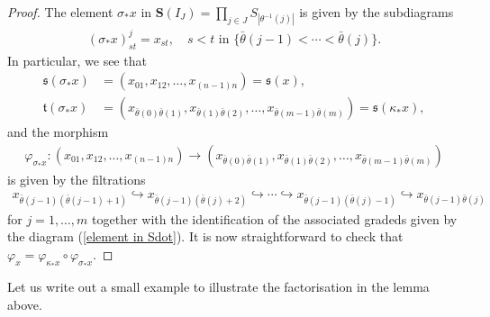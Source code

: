 \documentclass[12pt, reqno]{amsart}
\theoremstyle{plain}
\theoremstyle{definition}
\renewcommand{\phi}{\varphi}
\begin{document}
\begin{proof}
The element $\sigma_*x$ in $\mathbf{S}(I_J)=\prod_{j\in J} S_{|\theta^{-1}(j)|}$ is given by the subdiagrams 
\begin{align*}
(\sigma_*x)^j_{st}=x_{st}, \quad  s<t\text{ in } \{\bar{\theta}(j-1)<\cdots < \bar{\theta}(j)\}.
\end{align*}
In particular, we see that
\begin{align*}
\mathfrak{s}(\sigma_*x)&=(x_{01},x_{12},\ldots,x_{(n-1)n})= \mathfrak{s}(x), \\
\mathfrak{t}(\sigma_*x)&=(x_{\bar{\theta}(0)\bar{\theta}(1)},x_{\bar{\theta}(1)\bar{\theta}(2)},\ldots,x_{\bar{\theta}(m-1)\bar{\theta}(m)})=\mathfrak{s}(\kappa_*x),
\end{align*}
and the morphism
\begin{align*}
\phi_{\sigma_*x}\colon (x_{01},x_{12},\ldots,x_{(n-1)n}) \longrightarrow (x_{\bar{\theta}(0)\bar{\theta}(1)},x_{\bar{\theta}(1)\bar{\theta}(2)},\ldots,x_{\bar{\theta}(m-1)\bar{\theta}(m)})
\end{align*}
is given by the filtrations
\begin{align*}
x_{\bar{\theta}(j-1)(\bar{\theta}(j-1)+1)}\hookrightarrow x_{\bar{\theta}(j-1)(\bar{\theta}(j)+2)} \hookrightarrow \cdots \hookrightarrow x_{\bar{\theta}(j-1)(\bar{\theta}(j)-1)} \hookrightarrow x_{\bar{\theta}(j-1)\bar{\theta}(j)}
\end{align*}
for $j=1,\ldots,m$ together with the identification of the associated gradeds given by the diagram (\ref{element in Sdot}). It is now straightforward to check that $\phi_x=\phi_{\kappa_*x}\circ \phi_{\sigma_*x}$.
\end{proof}

Let us write out a small example to illustrate the factorisation in the lemma above.
\end{document}
